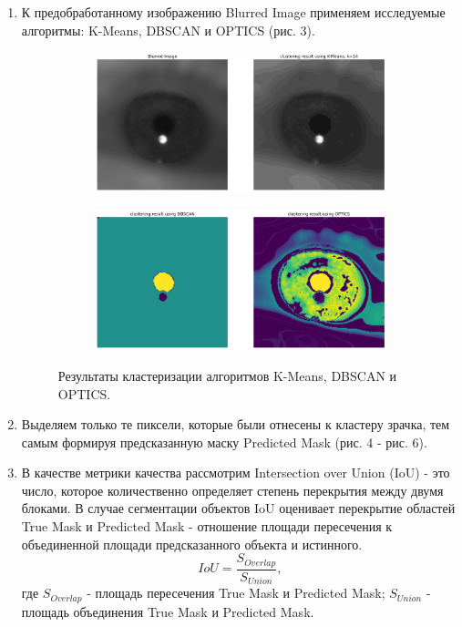 \documentclass{article}
\begin{document}
\begin{enumerate}
\item К предобработанному изображению Blurred Image применяем исследуемые алгоритмы: K-Means, DBSCAN и OPTICS (рис. 3). 
\begin{figure}
\centering
\begin{subfigure}{0.8\linewidth}
\includegraphics[width=\linewidth]{KMeans_results.png}
\end{subfigure}
\begin{subfigure}{0.8\linewidth}
\includegraphics[width=\linewidth]{DBSCAN_OPTICS_results.png}
\end{subfigure}
\caption{Результаты кластеризации алгоритмов K-Means, DBSCAN и OPTICS.}
\label{fig:mpr}
\end{figure}


\item Выделяем только те пиксели, которые были отнесены к кластеру зрачка, тем самым формируя предсказанную маску Predicted Mask (рис. 4 - рис. 6). 

\item В качестве метрики качества рассмотрим Intersection over Union (IoU) - это число, которое количественно определяет степень перекрытия между двумя блоками. В случае сегментации объектов IoU оценивает перекрытие областей True Mask и Predicted Mask - отношение площади пересечения к объединенной площади предсказанного объекта и истинного.
\begin{equation}
IoU = \frac{ S_{Overlap}}{S_{Union}},
\end{equation}
где $S_{Overlap}$ - площадь пересечения True Mask и Predicted Mask; $S_{Union}$ - площадь объединения True Mask и Predicted Mask.


\end{enumerate}
\end{document}
